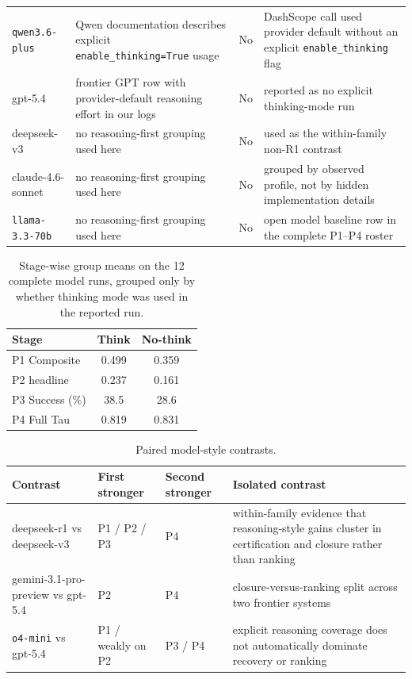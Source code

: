 \begin{table}[t]
\begin{tabular}{lp{33mm}p{17mm}p{54mm}}
\texttt{qwen3.6-plus} & Qwen documentation describes explicit \texttt{enable\_thinking=True} usage~\citep{qwen2026qwen36plus} & No & DashScope call used provider default without an explicit \texttt{enable\_thinking} flag \\
gpt-5.4 & frontier GPT row with provider-default reasoning effort in our logs & No & reported as no explicit thinking-mode run \\
deepseek-v3 & no reasoning-first grouping used here & No & used as the within-family non-R1 contrast \\
claude-4.6-sonnet & no reasoning-first grouping used here & No & grouped by observed profile, not by hidden implementation details \\
\texttt{llama-3.3-70b} & no reasoning-first grouping used here & No & open model baseline row in the complete P1--P4 roster \\
\bottomrule
\end{tabular}
\end{table}

\begin{table}[t]
\caption{Stage-wise group means on the 12 complete model runs, grouped only by whether thinking mode was used in the reported run.}
\label{tab:appendix_reasoning_groupmeans}
\centering
\scriptsize
\setlength{\tabcolsep}{5pt}
\renewcommand{\arraystretch}{1.08}
\begin{tabular}{lcc}
\toprule
Stage & Think & No-think \\
\midrule
P1 Composite & 0.499 & 0.359 \\
P2 headline & 0.237 & 0.161 \\
P3 Success (\%) & 38.5 & 28.6 \\
P4 Full Tau & 0.819 & 0.831 \\
\bottomrule
\end{tabular}
\end{table}



\begin{table}[t]
\caption{Paired model-style contrasts.}
\label{tab:appendix_modelstyle_pairs}
\centering
\scriptsize
\setlength{\tabcolsep}{4pt}
\renewcommand{\arraystretch}{1.08}
\begin{tabular}{lp{27mm}p{27mm}p{47mm}}
\toprule
Contrast & First stronger & Second stronger & Isolated contrast \\
\midrule
deepseek-r1 vs deepseek-v3 & P1 / P2 / P3 & P4 & within-family evidence that reasoning-style gains cluster in certification and closure rather than ranking \\
gemini-3.1-pro-preview vs gpt-5.4 & P2 & P4 & closure-versus-ranking split across two frontier systems \\
\texttt{o4-mini} vs gpt-5.4 & P1 / weakly on P2 & P3 / P4 & explicit reasoning coverage does not automatically dominate recovery or ranking \\
\bottomrule
\end{tabular}
\end{table}

